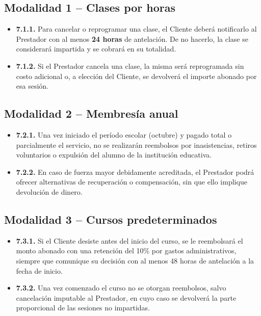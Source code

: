 \documentclass[12pt, letterpaper]{article}
\begin{document}
\subsection{Modalidad 1 -- Clases por horas}

\begin{itemize}[leftmargin=1.5em, itemsep=3pt, topsep=4pt]
  \item \textbf{7.1.1.} Para cancelar o reprogramar una clase, el Cliente deberá notificarlo al Prestador con al menos \textbf{24 horas} de antelación. De no hacerlo, la clase se considerará impartida y se cobrará en su totalidad.
  \item \textbf{7.1.2.} Si el Prestador cancela una clase, la misma será reprogramada sin costo adicional o, a elección del Cliente, se devolverá el importe abonado por esa sesión.
\end{itemize}

\subsection{Modalidad 2 -- Membresía anual}

\begin{itemize}[leftmargin=1.5em, itemsep=3pt, topsep=4pt]
  \item \textbf{7.2.1.} Una vez iniciado el período escolar (octubre) y pagado total o parcialmente el servicio, no se realizarán reembolsos por inasistencias, retiros voluntarios o expulsión del alumno de la institución educativa.
  \item \textbf{7.2.2.} En caso de fuerza mayor debidamente acreditada, el Prestador podrá ofrecer alternativas de recuperación o compensación, sin que ello implique devolución de dinero.
\end{itemize}

\subsection{Modalidad 3 -- Cursos predeterminados}

\begin{itemize}[leftmargin=1.5em, itemsep=3pt, topsep=4pt]
  \item \textbf{7.3.1.} Si el Cliente desiste antes del inicio del curso, se le reembolsará el monto abonado con una retención del 10\% por gastos administrativos, siempre que comunique su decisión con al menos 48 horas de antelación a la fecha de inicio.
  \item \textbf{7.3.2.} Una vez comenzado el curso no se otorgan reembolsos, salvo cancelación imputable al Prestador, en cuyo caso se devolverá la parte proporcional de las sesiones no impartidas.
\end{itemize}
\end{document}
